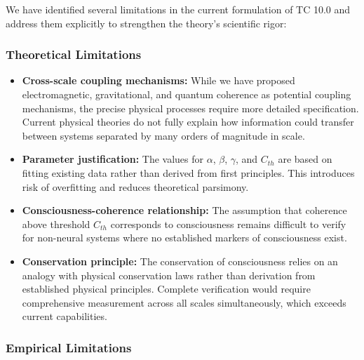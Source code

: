 \documentclass[12pt]{article}
\begin{document}
We have identified several limitations in the current formulation of TC 10.0 and address them explicitly to strengthen the theory's scientific rigor:

\subsubsection{Theoretical Limitations}

\begin{itemize}
    \item \textbf{Cross-scale coupling mechanisms:} While we have proposed electromagnetic, gravitational, and quantum coherence as potential coupling mechanisms, the precise physical processes require more detailed specification. Current physical theories do not fully explain how information could transfer between systems separated by many orders of magnitude in scale.
    
    \item \textbf{Parameter justification:} The values for $α$, $β$, $γ$, and $C_{th}$ are based on fitting existing data rather than derived from first principles. This introduces risk of overfitting and reduces theoretical parsimony.
    
    \item \textbf{Consciousness-coherence relationship:} The assumption that coherence above threshold $C_{th}$ corresponds to consciousness remains difficult to verify for non-neural systems where no established markers of consciousness exist.
    
    \item \textbf{Conservation principle:} The conservation of consciousness relies on an analogy with physical conservation laws rather than derivation from established physical principles. Complete verification would require comprehensive measurement across all scales simultaneously, which exceeds current capabilities.
\end{itemize}

\subsubsection{Empirical Limitations}
\end{document}
